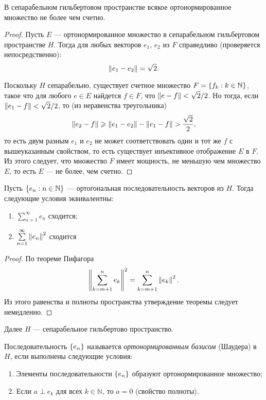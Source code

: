 \begin{lemma}     
В сепарабельном гильбертовом пространстве всякое ортонормированное множество не
более чем счетно.
\end{lemma}

\begin{proof}
    Пусть $E$ --- ортонормированное множество в сепарабельном гильбертовом пространстве $H$.
    Тогда для любых векторов $e_1$, $e_2$ из $F$ справедливо (проверяется непосредственно):
    \[ \left\|e_1 - e_2\right\| = \sqrt{2}. \]

    Поскольку $H$ сепарабельно, существует счетное множество $F = \left\{f_k : k \in \mathbb N\right\}$,
    такое что для любого $e \in E$ найдется $f \in F$, что $\left\|e - f\right\| < \sqrt{2}/2$.
    Но тогда, если $\left\|e_1 - f\right\| < \sqrt{2}/2$, то (из неравенства треугольника)
    \[ \left\|e_2 - f\right\| \geqslant \left\|e_1-e_2\right\| - \left\|e_1 - f\right\| > \frac{\sqrt{2}}{2}, \]
    то есть двум разным $e_1$ и $e_2$ не может соответствовать один и тот же $f$ с вышеуказанным свойством, то есть существует инъективное отображение $E$ в $F$.
    Из этого следует, что множество $F$ имеет мощность, не меньшую чем множество $E$, то есть $E$ --- не более, чем счетно.
\end{proof}

\begin{lemma}\label{le:series}
Пусть $\left\{e_n : n \in \mathbb N\right\}$ --- ортогональная последовательность векторов из $H$.
Тогда следующие условия эквивалентны:
\begin{enumerate}
    \item $\sum\limits_{n=1}^\infty e_n$ сходится;
    \item $\sum\limits_{n=1}^\infty \left\|e_n\right\|^2$ сходится
\end{enumerate}
\end{lemma}

\begin{proof}
    По теореме Пифагора
    \[ \left\|\sum_{k = m+1}^n e_k\right\|^2 = \sum_{k=m+1}^n \left\|e_k\right\|^2. \]
    Из этого равенства и полноты пространства утверждение теоремы следует немедленно.
\end{proof}

Далее $H$ --- сепарабельное гильбертово пространство.
\begin{definition}
    Последовательность $\left\{e_n\right\}$ называется \emph{ортонормированным базисом} (Шаудера) в $H$, если выполнены следующие условия:
    \begin{enumerate}
        \item Элементы последовательности $\left\{e_n\right\}$ образуют ортонормированное множество;
        \item Если $a \perp e_k$ для всех $k \in \mathbb N$, то $a = 0$ (свойство полноты).
    \end{enumerate}
\end{definition}


